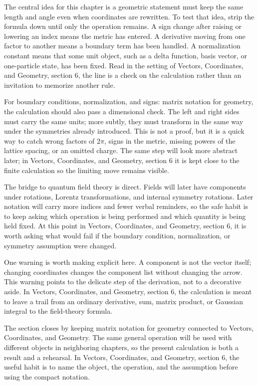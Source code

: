 The central idea for this chapter is a geometric statement must keep the same length and angle even when coordinates are rewritten.  To test that idea, strip the formula down until only the operation remains.  A sign change after raising or lowering an index means the metric has entered.  A derivative moving from one factor to another means a boundary term has been handled.  A normalization constant means that some unit object, such as a delta function, basis vector, or one-particle state, has been fixed.  Read in the setting of Vectors, Coordinates, and Geometry, section 6, the line is a check on the calculation rather than an invitation to memorize another rule.

For boundary conditions, normalization, and signs: matrix notation for geometry, the calculation should also pass a dimensional check.  The left and right sides must carry the same units; more subtly, they must transform in the same way under the symmetries already introduced.  This is not a proof, but it is a quick way to catch wrong factors of \(2\pi\), signs in the metric, missing powers of the lattice spacing, or an omitted charge.  The same step will look more abstract later; in Vectors, Coordinates, and Geometry, section 6 it is kept close to the finite calculation so the limiting move remains visible.

The bridge to quantum field theory is direct.  Fields will later have components under rotations, Lorentz transformations, and internal symmetry rotations.  Later notation will carry more indices and fewer verbal reminders, so the safe habit is to keep asking which operation is being performed and which quantity is being held fixed.  At this point in Vectors, Coordinates, and Geometry, section 6, it is worth asking what would fail if the boundary condition, normalization, or symmetry assumption were changed.

One warning is worth making explicit here.  A component is not the vector itself; changing coordinates changes the component list without changing the arrow.  This warning points to the delicate step of the derivation, not to a decorative aside.  In Vectors, Coordinates, and Geometry, section 6, the calculation is meant to leave a trail from an ordinary derivative, sum, matrix product, or Gaussian integral to the field-theory formula.

The section closes by keeping matrix notation for geometry connected to Vectors, Coordinates, and Geometry.  The same general operation will be used with different objects in neighboring chapters, so the present calculation is both a result and a rehearsal.  In Vectors, Coordinates, and Geometry, section 6, the useful habit is to name the object, the operation, and the assumption before using the compact notation.



